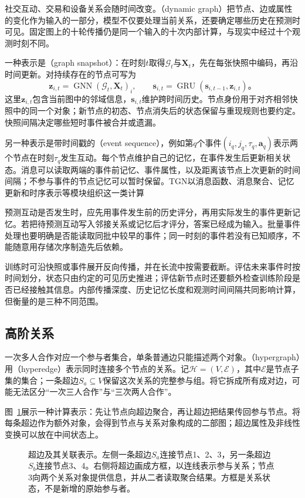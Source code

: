 社交互动、交易和设备关系会随时间改变。（dynamic graph）把节点、边或属性的变化作为输入的一部分，模型不仅要处理当前关系，还要确定哪些历史在预测时可见。固定图上的十轮传播仍是同一个输入的十次内部计算，与现实中经过十个观测时刻不同。

一种表示是（graph snapshot）：在时刻$t$取得$\mathcal{G}_t$与$\bm{X}_t$，先在每张快照中编码，再沿时间更新。对持续存在的节点可写为
\begin{equation}
  \bm{z}_{i,t}=\operatorname{GNN}(\mathcal{G}_t,\bm{X}_t)_i,
  \qquad
  \bm{s}_{i,t}=\operatorname{GRU}(\bm{s}_{i,t-1},\bm{z}_{i,t})\text{。}
  \label{eq:gnn-snapshot-dynamics}
\end{equation}
这里$\bm{z}_{i,t}$包含当前图中的邻域信息，$\bm{s}_{i,t}$维护跨时间历史。节点身份用于对齐相邻快照中的同一个对象；新节点的初态、节点消失后的状态保留与重现规则也要约定。快照间隔决定哪些短时事件被合并或遗漏。

另一种表示是带时间戳的（event sequence），例如第$q$个事件$(i_q,j_q,\tau_q,\bm{a}_q)$表示两个节点在时刻$\tau_q$发生互动。每个节点维护自己的记忆，在事件发生后更新相关状态。消息可以读取两端的事件前记忆、事件属性，以及距离该节点上次更新的时间间隔；不参与事件的节点记忆可以暂时保留。TGN以消息函数、消息聚合、记忆更新和时序表示等模块组织这一类计算

预测互动是否发生时，应先用事件发生前的历史评分，再用实际发生的事件更新记忆。若把待预测互动写入邻接关系或记忆后才评分，答案已经成为输入。批量事件处理也要明确是否能读取同批中较早的事件；同一时刻的事件若没有已知顺序，不能随意用存储次序制造先后依赖。

训练时可沿快照或事件展开反向传播，并在长流中按需要截断。评估未来事件时按时间划分，状态只由约定的可见历史推进；评估新节点时还要额外检查训练阶段是否已经接触其信息。内部传播深度、历史记忆长度和观测时间间隔共同影响计算，但衡量的是三种不同范围。

\subsection{高阶关系}
\label{sec:gnn-higher-order}

一次多人合作对应一个参与者集合，单条普通边只能描述两个对象。（hypergraph）用（hyperedge）表示同时连接多个节点的关系。记$\mathcal{H}=(V,\mathcal{E})$，其中$\mathcal{E}$是节点子集的集合；一条超边$S_a\subseteq V$保留这次关系的完整参与组。将它拆成所有成对边，可能无法区分“一次三人合作”与“三次两人合作”。

图~\ref{fig:gnn-hyperedge}展示一种计算表示：先让节点向超边聚合，再让超边把结果传回参与节点。将每条超边作为额外对象，会得到节点与关系对象构成的二部图；超边属性及非线性变换可以放在中间状态上。
\begin{figure}[htb]
  \centering
  
  \caption{超边及其关联表示。左侧一条超边$S_a$连接节点1、2、3，另一条超边$S_b$连接节点3、4。右侧将超边画成方框，以连线表示参与关系；节点3向两个关系对象提供信息，并从二者读取聚合结果。方框是关系状态，不是新增的原始参与者。}
  \label{fig:gnn-hyperedge}
\end{figure}

